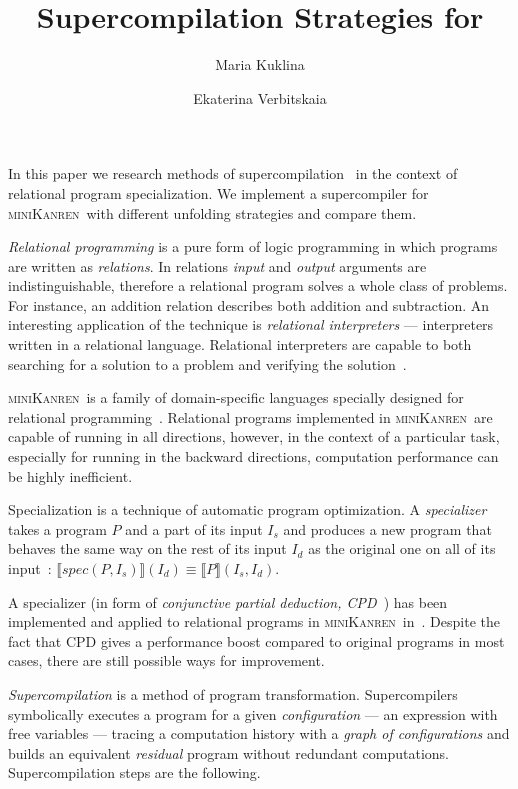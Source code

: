 \documentclass[submission,copyright,creativecommons]{eptcs}
\title{Supercompilation Strategies for \miniKanren}
\author{Maria Kuklina
\institute{ITMO University\\ Saint Petersburg, Russia}
\email{kuklina.md@gmail.com}
\and
Ekaterina Verbitskaia
\institute{JetBrains Research\\
Saint Petersburg, Russia}
\email{kajigor@gmail.com}
}
\newcommand{\miniKanren}{\textsc{miniKanren}\ }
\begin{document}
\maketitle

In this paper we research methods of supercompilation~\cite{introSC} in the context of relational program specialization.
We implement a supercompiler for \miniKanren with different unfolding strategies and compare them.

{\it Relational programming} is a pure form of logic programming in which programs are
written as {\it relations}. In relations {\it input} and {\it output} arguments are indistinguishable,
therefore a relational program solves a whole class of problems.
For instance, an addition relation describes both addition and subtraction.
An interesting application of the technique is {\it relational interpreters} --- interpreters written in a relational language.
Relational interpreters are capable to both searching for a solution to a problem and verifying the solution~\cite{lozov2019}.

\miniKanren is a family of domain-specific languages specially designed for relational programming~\cite{friedmanSchemer}.
Relational programs implemented in \miniKanren are capable of running in all directions, however, in the context of a particular
task, especially for running in the backward directions, computation performance can be highly inefficient.

Specialization is a technique of automatic program optimization. A {\it specializer} takes a program $P$ and a part
of its input $I_s$ and produces a new program that behaves the same way on the rest of its input $I_d$ as the original
one on all of its input~\cite{jones1993partial}:
$\llbracket spec(P, I_s) \rrbracket (I_d) \equiv \llbracket P \rrbracket (I_s, I_d)$.

A specializer (in form of {\it conjunctive partial deduction, CPD}~\cite{cpd}) has been implemented and applied to
relational programs in \miniKanren in~\cite{lozov2019}. Despite the fact that CPD gives a performance boost
compared to original programs in most cases,
there are still possible ways for improvement.

{\it Supercompilation} is a method of program transformation. Supercompilers symbolically
executes a program for a given {\it configuration} --- an expression with free variables ---
tracing a computation history with a {\it graph of configurations} and builds an equivalent {\it residual}
program without redundant computations.
Supercompilation steps are the following.
\end{document}
